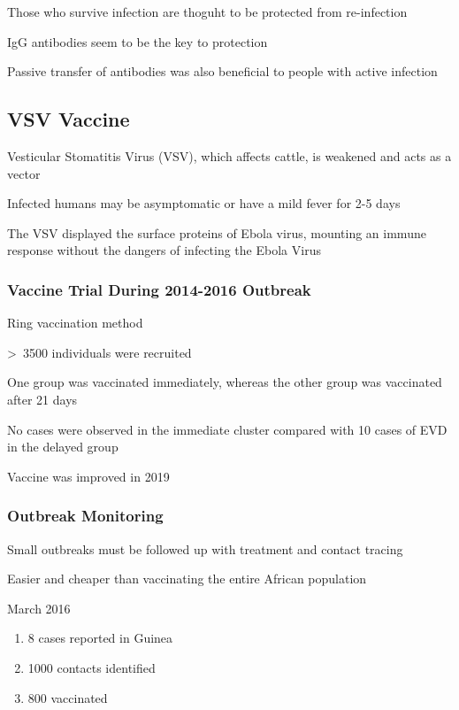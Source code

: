 \documentclass{notes}
\begin{document}
\tab Those who survive infection are thoguht to be protected from re-infection

IgG antibodies seem to be the key to protection

\tab Passive transfer of antibodies was also beneficial to people with active infection

\subsection{VSV Vaccine}

Vesticular Stomatitis Virus (VSV), which affects cattle, is weakened and acts as a vector

\tab Infected humans may be asymptomatic or have a mild fever for 2-5 days

The VSV displayed the surface proteins of Ebola virus, mounting an immune response without the dangers of infecting the Ebola Virus

\subsubsection{Vaccine Trial During 2014-2016 Outbreak}

Ring vaccination method

\textgreater \ 3500 individuals were recruited

\tab One group was vaccinated immediately, whereas the other group was vaccinated after 21 days

No cases were observed in the immediate cluster compared with 10 cases of EVD in the delayed group

Vaccine was improved in 2019

\subsubsection{Outbreak Monitoring}

Small outbreaks must be followed up with treatment and contact tracing

\tab Easier and cheaper than vaccinating the entire African population

March 2016

\begin{enumerate}
    \item 8 cases reported in Guinea
    \item 1000 contacts identified
    \item 800 vaccinated
\end{enumerate}
\end{document}
